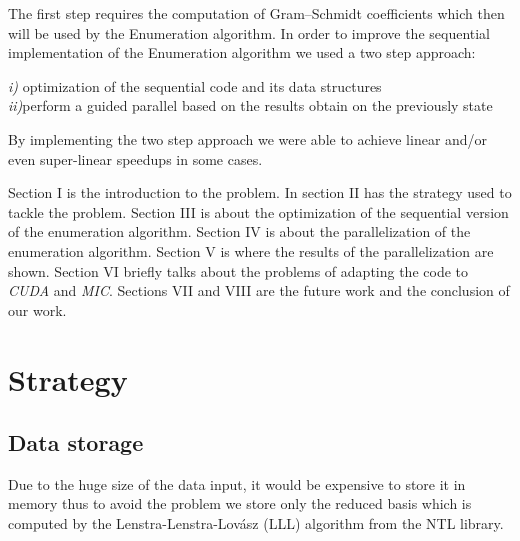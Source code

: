 \documentclass[conference]{IEEEtran}
\begin{document}
    The first step requires the computation of Gram–Schmidt coefficients which then will be used by the Enumeration algorithm. In order to improve the sequential implementation of the Enumeration algorithm we used a two step approach:    
    
    \emph{i)} optimization of the sequential code and its data structures\\
    \indent \emph{ii)}perform a guided parallel based on the results obtain on the previously state
    
    By implementing the two step approach we were able to achieve linear and/or even super-linear speedups in some cases.
  
   Section I is the introduction to the problem. In section II has the strategy used to tackle the problem. Section III is about the optimization of the sequential version of the enumeration algorithm. Section IV is about the parallelization of the enumeration algorithm. Section V is where the results of the parallelization are shown. Section VI briefly talks about the problems of adapting the code to \emph{CUDA} and \emph{MIC}. Sections VII and VIII are the future work and the conclusion of our work.
 
\section{Strategy}
 
 
 
\subsection{Data storage}
    
    Due to the huge size of the data input, it would be expensive to store it in memory thus to avoid the problem we store only the reduced basis which is computed by the Lenstra-Lenstra-Lovász (LLL) algorithm from the NTL library.
    
\end{document}
